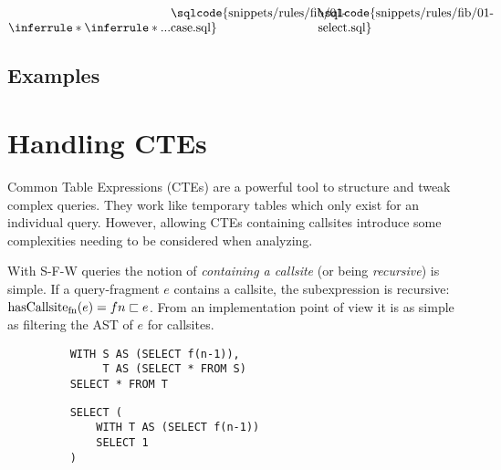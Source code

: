 

$
\inferrule*{
    \inferrule*{...}{
{\begin{minipage}[b]{12em}
\sqlcode{snippets/rules/fib/01-case.sql}
\end{minipage}}
    }
}{
{\begin{minipage}[b]{12em}
\sqlcode{snippets/rules/fib/01-select.sql}
\end{minipage}}
}
$

\fi

\subsection{Examples}


\section{Handling CTEs}

Common Table Expressions (CTEs) are a powerful tool to structure and tweak complex queries. They work like temporary tables which only exist for an individual query. However, allowing CTEs containing callsites introduce some complexities needing to be considered when analyzing.

With S-F-W queries the notion of \textit{containing a callsite} (or being \textit{recursive}) is simple. If a query-fragment $e$ contains a callsite, the subexpression is recursive: $\operatorname{\text{hasCallsite}_{fn}}(e) = fn \sqsubset e$. From an implementation point of view it is as simple as filtering the AST of $e$ for callsites.

\begin{wrapfigure}{r}{.5\textwidth} 
    \begin{minipage}{\linewidth}
    \label{fig:simple_indiref}\par\vfill
    \begin{verbatim}
    WITH S AS (SELECT f(n-1)),
         T AS (SELECT * FROM S)
    SELECT * FROM T
    \end{verbatim}
    \label{fig:indirect_callsite}\par
    \vspace{3mm}
    \begin{verbatim}
    SELECT (
        WITH T AS (SELECT f(n-1))
        SELECT 1
    )
    \end{verbatim}
    \label{fig:unused_callsite}
\end{minipage}
\caption{}
\label{lst:indirect_callsite_ref}\vspace{-5mm} 
\end{wrapfigure}

